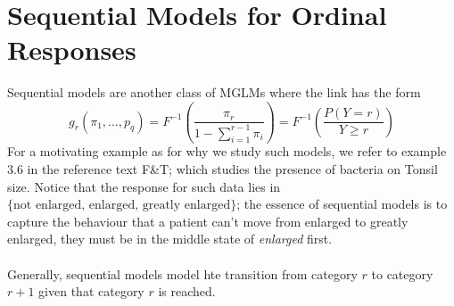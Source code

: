 
\section{Sequential Models for Ordinal Responses}

Sequential models are another class of MGLMs where the link has the form 
$$g_r(\pi_1, \dots, p_q) = F^{-1}\left(\frac{\pi_r}{1 - \sum_{i=1}^{r-1}\pi_i}\right) = F^{-1}\left(\frac{P(Y=r)}{Y\geq r}\right)$$
For a motivating example as for why we study such models, we refer to example 3.6 in the reference text F\&T; which studies the presence of bacteria on Tonsil size. Notice that the response for such data lies in $\{\text{not enlarged, enlarged, greatly enlarged}\}$; the essence of sequential models is to capture the behaviour that a patient can't move from enlarged to greatly enlarged, they must be in the middle state of \textit{enlarged} first. \\
\\
Generally, sequential models model hte transition from category $r$ to category $r+1$ given that category $r$ is reached.




